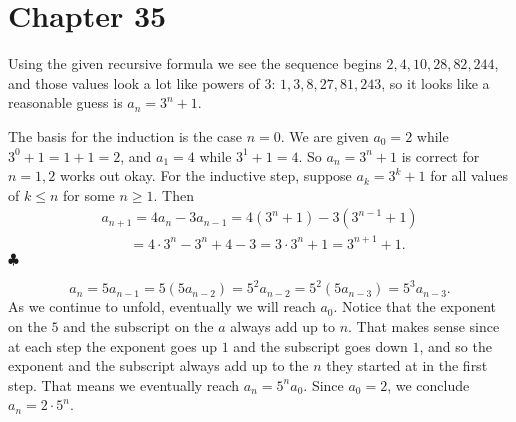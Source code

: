    \section*{Chapter 35}
  
    
\begin{Solution}{35.1}

Using the given recursive formula we see the sequence begins $2, 4, 10,  28, 82, 244$, and those values look a
lot like powers of $3$: $1, 3, 8, 27, 81, 243$, so it looks like a reasonable guess is $a_n = 3^n + 1$.

The basis for the induction is the case $n=0$. We are given $a_0 = 2$ while $3^0+1 = 1+1 = 2$,  and
$a_1 = 4$ while $3^1 + 1 = 4$. So $a_n = 3^n+1$ is correct for $n=1,2$
works out okay. For the inductive step, suppose $a_k = 3^k + 1$ for all values of $k\leq n$ for some $n\geq 1$. Then 
\begin{gather*}
a_{n+1} = 4a_{n} - 3a_{n-1} = 4(3^{n}+1) -3(3^{n-1} + 1) \\
\qquad = 4\cdot3^{n} - 3^{n} + 4 - 3 = 3\cdot3^{n} + 1 = 3^{n+1} + 1.
\end{gather*}
$\clubsuit$

\end{Solution}

\begin{Solution}{35.2}

\[ 
a_n = 5a_{n-1} = 5(5a_{n-2}) = 5^2a_{n-2} = 5^2(5a_{n-3}) = 5^3a_{n-3}.
\]
As we continue to unfold, eventually we will reach $a_0$. Notice that the exponent on the $5$ and the subscript on the $a$ always add up to $n$. That makes sense since at each step the exponent goes up $1$ and the subscript goes down $1$, and so the exponent and the subscript always add up to the $n$ they started at in the first step.
That means we eventually reach $a_n = 5^na_0$. Since $a_0 = 2$, we conclude $a_n = 2\cdot 5^n$.

\end{Solution}


